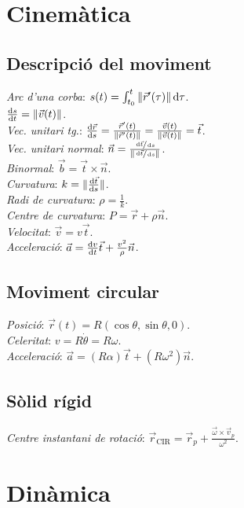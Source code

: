 \documentclass[10pt]{article}
\newcommand{\ci}{\textbullet\;}
\begin{document}
\ifland
\raggedright
\begin{multicols}{3}
\fi

\section{Cinem\`atica}

\subsection{Descripci\'o del moviment}
\emph{Arc d'una corba}: $s(t) = \int^t_{t_0} \|\vec{r}'(\tau)\| \dif\tau$. \\
\ci $\frac{\dif s}{\dif t} = \|\vec{v}(t)\|$. \\
\emph{Vec. unitari tg.}: $\frac{\dif \vec{r}}{\dif s} = \frac{\vec{r}'(t)}{\|\vec{r}'(t)\|} = \frac{\vec{v}(t)}{\|\vec{v}(t)\|} = \vec{t}$. \\
\emph{Vec. unitari normal}: $\vec{n} = \frac{\sfrac{\dif \vec{t}}{\dif s}}{\|\sfrac{\dif \vec{t}}{\dif s}\|}$. \\
\emph{Binormal}: $\vec{b} = \vec{t} \times \vec{n}$. \\
\emph{Curvatura}: $k = \|\frac{\dif \vec{t}}{\dif s}\|$. \\
\emph{Radi de curvatura}: $\rho = \frac{1}{k}$. \\
\emph{Centre de curvatura}: $P = \vec{r} + \rho\vec{n}$.\\
\emph{Velocitat}: $\vec{v} = v\vec{t}$. \\
\emph{Acceleraci\'o}: $\vec{a} = \frac{\dif v}{\dif t}\vec{t} + \frac{v^2}{\rho}\vec{n}$.

\subsection{Moviment circular}
\emph{Posici\'o}: $\vec{r}(t) = R(\cos \theta, \sin \theta, 0)$. \\
\emph{Celeritat}: $v = R\dot\theta = R\omega$. \\
\emph{Acceleraci\'o}: $\vec{a} = (R\alpha)\vec{t} + (R\omega^2)\vec{n}$.

\subsection{S\`olid r\'igid}
\emph{Centre instantani de rotaci\'o}: $\vec{r}_{\text{CIR}} = \vec{r}_p + \frac{\vec{\omega} \times \vec{v}_p}{\omega^2}$.

\section{Din\`amica}


\end{multicols}
\end{document}
